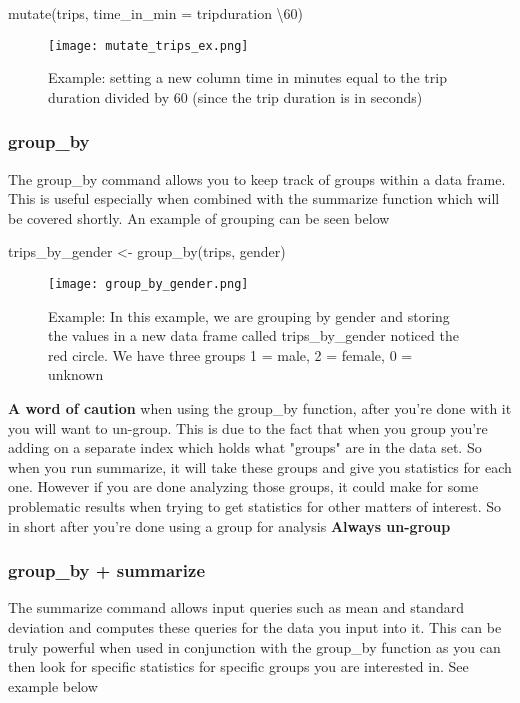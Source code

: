 \begin{center}
mutate(trips, time\_in\_min = tripduration \textbackslash 60)
\end{center}

\begin{figure}[H]
    \centering
    \texttt{[image: mutate\_trips\_ex.png]}
    \caption{Example: setting a new column time in minutes equal to the trip duration divided by 60 (since the trip duration is in seconds)}
    \label{fig:mutate_trips_ex}
\end{figure}


\subsubsection{group\_by}
\begin{flushleft}
The group\_by command allows you to keep track of groups within a data frame. This is useful especially when combined with the summarize function which will be covered shortly. An example of grouping can be seen below
\end{flushleft}

\begin{center}
trips\_by\_gender <- group\_by(trips, gender)
\end{center}    

\begin{figure}[H]
    \centering
    \texttt{[image: group\_by\_gender.png]}
    \caption{Example: In this example, we are grouping by gender and storing the values in a new data frame called trips\_by\_gender noticed the red circle. We have three groups 1 = male, 2 = female, 0 = unknown}
    \label{fig:group_by_gender}
\end{figure}

\begin{flushleft}
\textbf{A word of caution} when using the group\_by function, after you're done with it you will want to un-group. This is due to the fact that when you group you're adding on a separate index which holds what "groups" are in the data set. So when you run summarize, it will take these groups and give you statistics for each one. However if you are done analyzing those groups, it could make for some problematic results when trying to get statistics for other matters of interest. So in short after you're done using a group for analysis \textbf{Always un-group}
\end{flushleft}

\subsubsection{group\_by + summarize}
\begin{flushleft}
The summarize command allows input queries such as mean and standard deviation and computes these queries for the data you input into it. This can be truly powerful when used in conjunction with the group\_by function as you can then look for specific statistics for specific groups you are interested in. 
See example below
\end{flushleft}

